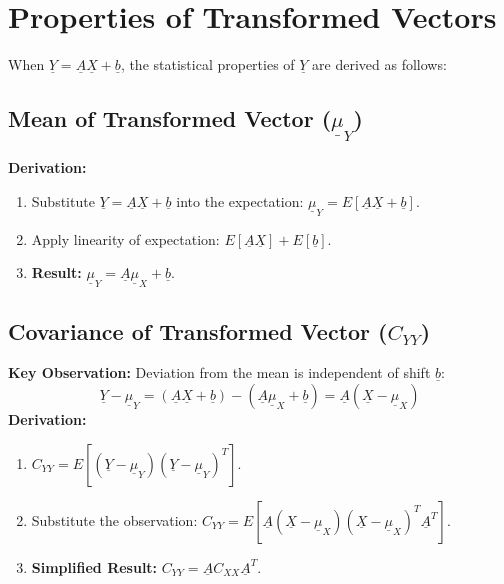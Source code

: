 \documentclass[12pt]{article}
\begin{document}
\section{Properties of Transformed Vectors}
When $\underline{Y} = \underline{A}\underline{X} + \underline{b}$, the statistical properties of $\underline{Y}$ are derived as follows:

\subsection{Mean of Transformed Vector ($\underline{\mu}_Y$)}
\textbf{Derivation:}
\begin{enumerate}
    \item Substitute $\underline{Y} = \underline{A}\underline{X} + \underline{b}$ into the expectation: $\underline{\mu}_Y = E[\underline{A}\underline{X} + \underline{b}]$.
    \item Apply linearity of expectation: $E[\underline{A}\underline{X}] + E[\underline{b}]$.
    \item \textbf{Result:} $\underline{\mu}_Y = \underline{A}\underline{\mu}_X + \underline{b}$.
\end{enumerate}

\subsection{Covariance of Transformed Vector ($C_{YY}$)}
\textbf{Key Observation:} Deviation from the mean is independent of shift $\underline{b}$:
\[
\underline{Y} - \underline{\mu}_Y = (\underline{A}\underline{X} + \underline{b}) - (\underline{A}\underline{\mu}_X + \underline{b}) = \underline{A}(\underline{X} - \underline{\mu}_X)
\]
\textbf{Derivation:}
\begin{enumerate}
    \item $C_{YY} = E[(\underline{Y} - \underline{\mu}_Y)(\underline{Y} - \underline{\mu}_Y)^T]$.
    \item Substitute the observation: $C_{YY} = E[\underline{A}(\underline{X} - \underline{\mu}_X)(\underline{X} - \underline{\mu}_X)^T\underline{A}^T]$.
    \item \textbf{Simplified Result:} $C_{YY} = \underline{A}C_{XX}\underline{A}^T$.
\end{enumerate}
\end{document}
